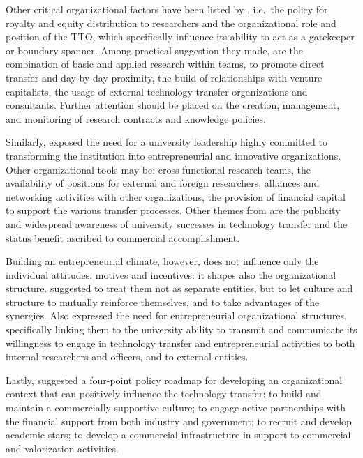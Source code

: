 Other critical organizational factors have been listed by \citet{Debackere2005}, i.e.\ the policy for royalty and equity distribution to researchers and the organizational role and position of the TTO, which specifically influence its ability to act as a gatekeeper or boundary spanner. Among practical suggestion they made, are the combination of basic and applied research within teams, to promote direct transfer and day-by-day proximity, the build of relationships with venture capitalists, the usage of external technology transfer organizations and consultants. Further attention should be placed on the creation, management, and monitoring of research contracts and knowledge policies.

Similarly, \citet{Guerrero2014} exposed the need for a university leadership highly committed to transforming the institution into entrepreneurial and innovative organizations. Other organizational tools may be: cross-functional research teams, the availability of positions for external and foreign researchers, alliances and networking activities with other organizations, the provision of financial capital to support the various transfer processes. Other themes from \citet{OwenSmith2001} are the publicity and widespread awareness of university successes in technology transfer and the status benefit ascribed to commercial accomplishment.

Building an entrepreneurial climate, however, does not influence only the individual attitudes, motives and incentives: it shapes also the organizational structure. \citet{Rasmussen2006} suggested to treat them not as separate entities, but to let culture and structure to mutually reinforce themselves, and to take advantages of the synergies. Also \citet{Guerrero2014} expressed the need for entrepreneurial organizational structures, specifically linking them to the university ability to transmit and communicate its willingness to engage in technology transfer and entrepreneurial activities to both internal researchers and officers, and to external entities.  

Lastly, \citet{OShea2005} suggested a four-point policy roadmap for developing an organizational context that can positively influence the technology transfer: to build and maintain a commercially supportive culture; to engage active partnerships with the financial support from both industry and government; to recruit and develop academic stars; to develop a commercial infrastructure in support to commercial and valorization activities.

